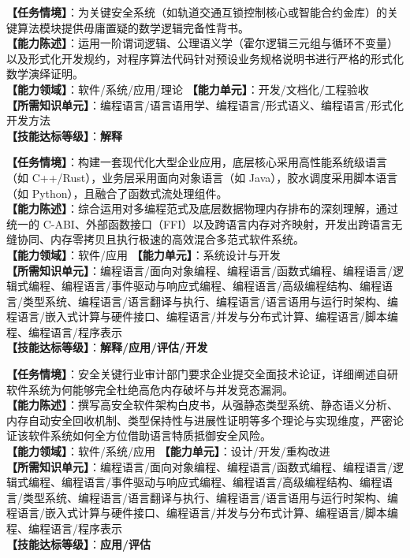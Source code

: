\begin{taskbox}[任务 8：运用数理逻辑与形式化方法论证程序针对功能规约的严格正确性]
\textbf{【任务情境】}：为关键安全系统（如轨道交通互锁控制核心或智能合约金库）的关键算法模块提供毋庸置疑的数学逻辑完备性背书。\\
\textbf{【能力陈述】}：运用一阶谓词逻辑、公理语义学（霍尔逻辑三元组与循环不变量）以及形式化开发规约，对程序算法代码针对预设业务规格说明书进行严格的形式化数学演绎证明。\\
\textbf{【能力领域】}：软件/系统/应用/理论 \quad \textbf{【能力单元】}：开发/文档化/工程验收\\
\textbf{【所需知识单元】}：编程语言/语言语用学、编程语言/形式语义、编程语言/形式化开发方法\\
\textbf{【技能达标等级】}：\textbf{解释}
\end{taskbox}

\begin{taskbox}[任务 9：构建多语言混合系统并实现异构组件间的高效互操作与协同]
\textbf{【任务情境】}：构建一套现代化大型企业应用，底层核心采用高性能系统级语言（如 C++/Rust），业务层采用面向对象语言（如 Java），胶水调度采用脚本语言（如 Python），且融合了函数式流处理组件。\\
\textbf{【能力陈述】}：综合运用对多编程范式及底层数据物理内存排布的深刻理解，通过统一的 C-ABI、外部函数接口（FFI）以及跨语言内存对齐映射，开发出跨语言无缝协同、内存零拷贝且执行极速的高效混合多范式软件系统。\\
\textbf{【能力领域】}：软件/应用 \quad \textbf{【能力单元】}：系统设计与开发\\
\textbf{【所需知识单元】}：编程语言/面向对象编程、编程语言/函数式编程、编程语言/逻辑式编程、编程语言/事件驱动与响应式编程、编程语言/高级编程结构、编程语言/类型系统、编程语言/语言翻译与执行、编程语言/语言语用与运行时架构、编程语言/嵌入式计算与硬件接口、编程语言/并发与分布式计算、编程语言/脚本编程、编程语言/程序表示\\
\textbf{【技能达标等级】}：\textbf{解释/应用/评估/开发}
\end{taskbox}

\begin{taskbox}[任务 10：撰写高安全软件技术白皮书详述现代语言特性对安全性与健壮性的保障机制]
\textbf{【任务情境】}：安全关键行业审计部门要求企业提交全面技术论证，详细阐述自研软件系统为何能够完全杜绝高危内存破坏与并发竞态漏洞。\\
\textbf{【能力陈述】}：撰写高安全软件架构白皮书，从强静态类型系统、静态语义分析、内存自动安全回收机制、类型保持性与进展性证明等多个理论与实现维度，严密论证该软件系统如何全方位借助语言特质抵御安全风险。\\
\textbf{【能力领域】}：软件/系统/应用 \quad \textbf{【能力单元】}：设计/开发/重构改进\\
\textbf{【所需知识单元】}：编程语言/面向对象编程、编程语言/函数式编程、编程语言/逻辑式编程、编程语言/事件驱动与响应式编程、编程语言/高级编程结构、编程语言/类型系统、编程语言/语言翻译与执行、编程语言/语言语用与运行时架构、编程语言/嵌入式计算与硬件接口、编程语言/并发与分布式计算、编程语言/脚本编程、编程语言/程序表示\\
\textbf{【技能达标等级】}：\textbf{应用/评估}
\end{taskbox}

